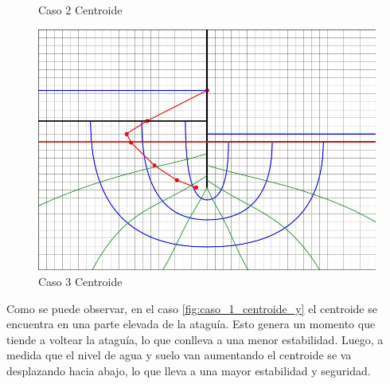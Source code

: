 \begin{figure}[H]
\begin{minipage}{0.32\textwidth}
        \caption{Caso 2 Centroide}
        \label{fig:caso_2_centroide_y}
    \end{minipage}
    \begin{minipage}{0.32\textwidth}
        \centering
        \includegraphics[width=\textwidth]{GRAFICOS/caso_3_centroide_y.jpg}
        \caption{Caso 3 Centroide}
        \label{fig:caso_3_centroide_y}
    \end{minipage}
\end{figure}

Como se puede observar, en el caso \ref{fig:caso_1_centroide_y} el centroide se encuentra en una parte elevada de la ataguía. Esto genera un momento que tiende a voltear la ataguía, lo que conlleva a una menor estabilidad. Luego, a medida que el nivel de agua y suelo van aumentando el centroide se va desplazando hacia abajo, lo que lleva a una mayor estabilidad y seguridad. 

